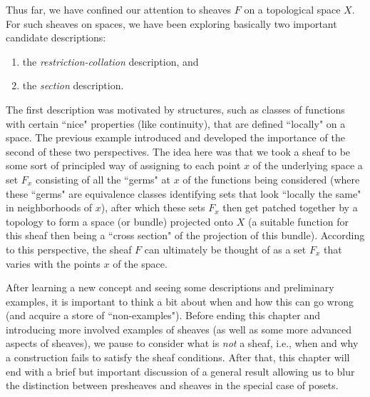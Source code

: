 \documentclass[a4paper]{book}
\theoremstyle{definition}
\theoremstyle{definition}
\theoremstyle{definition}
\theoremstyle{theorem}
\theoremstyle{definition}
\begin{document}
Thus far, we have confined our attention to sheaves $F$ on a topological space $X$. For such sheaves on spaces, we have been exploring basically two important candidate descriptions: 
\begin{enumerate} 
	\item the \textit{restriction-collation} description, and 
	\item the \textit{section} description.
\end{enumerate} 
	The first description was motivated by structures, such as classes of functions with certain ``nice" properties (like continuity), that are defined ``locally" on a space. The previous example introduced and developed the importance of the second of these two perspectives. The idea here was that we took a sheaf to be some sort of principled way of assigning to each point $x$ of the underlying space a set $F_x$ consisting of all the ``germs" at $x$ of the functions being considered (where these ``germs" are equivalence classes identifying sets that look ``locally the same" in neighborhoods of $x$), after which these sets $F_x$ then get patched together by a topology to form a space (or bundle) projected onto $X$ (a suitable function for this sheaf then being a ``cross section" of the projection of this bundle). According to this perspective, the sheaf $F$ can ultimately be thought of as a set $F_x$ that varies with the points $x$ of the space. \par 
	After learning a new concept and seeing some descriptions and preliminary examples, it is important to think a bit about when and how this can go wrong (and acquire a store of ``non-examples"). Before ending this chapter and introducing more involved examples of sheaves (as well as some more advanced aspects of sheaves), we pause to consider what is \textit{not} a sheaf, i.e., when and why a construction fails to satisfy the sheaf conditions.  After that, this chapter will end with a brief but important discussion of a general result allowing us to blur the distinction between presheaves and sheaves in the special case of posets. 
\end{document}
